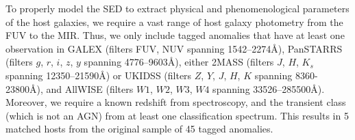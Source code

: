 \documentclass[twocolumn]{aastex63}
\begin{document}
To properly model the SED to extract physical and phenomenological parameters of the host galaxies, we require a vast range of host galaxy photometry from the FUV to the MIR. Thus, we only include tagged anomalies that have at least one observation in GALEX (filters FUV, NUV spanning 1542–2274\AA), PanSTARRS (filters $g$, $r$, $i$, $z$, $y$ spanning 4776–9603\AA), either 2MASS (filters $J$, $H$, $K_s$ spanning 12350–21590\AA) or UKIDSS (filters $Z$, $Y$, $J$, $H$, $K$ spanning 8360-23800\AA), and AllWISE (filters $W1$, $W2$, $W3$, $W4$ spanning 33526–285500\AA). Moreover, we require a known redshift from spectroscopy, and the transient class (which is not an AGN) from at least one classification spectrum. This results in 5 matched hosts from the original sample of 45 tagged anomalies. \par



\end{document}
